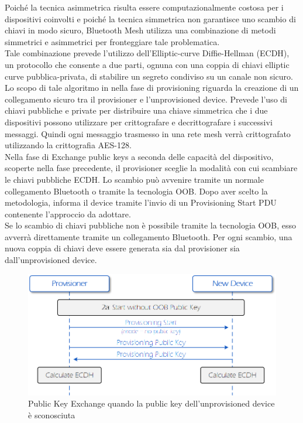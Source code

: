\noindent Poiché la tecnica asimmetrica risulta essere computazionalmente costosa per i dispositivi coinvolti e poiché la tecnica simmetrica non garantisce uno scambio di chiavi in modo sicuro, Bluetooth Mesh utilizza una combinazione di metodi simmetrici e asimmetrici per fronteggiare tale problematica.\\
Tale combinazione prevede l'utilizzo dell'Elliptic-curve Diffie-Hellman (ECDH), un protocollo che consente a due parti, ognuna con una coppia di chiavi elliptic curve pubblica-privata, di stabilire un segreto condiviso su un canale non sicuro. Lo scopo di tale algoritmo in nella fase di provisioning riguarda la creazione di un collegamento sicuro tra il provisioner e l'unprovisioned device. Prevede l'uso di chiavi pubbliche e private per distribuire una chiave simmetrica che i due dispositivi possono utilizzare per crittografare e decrittografare i successivi messaggi. Quindi ogni messaggio trasmesso in una rete mesh verrà crittografato utilizzando la crittografia AES-128.\\

\noindent Nella fase di Exchange public keys a seconda delle capacità del dispositivo, scoperte nella fase precedente, il provisioner sceglie la modalità con cui scambiare le chiavi pubbliche ECDH. Lo scambio può avvenire tramite un normale collegamento Bluetooth o tramite la tecnologia OOB.
Dopo aver scelto la metodologia, informa il device tramite l'invio di un Provisioning Start PDU contenente l'approccio da adottare.\\

\noindent Se lo scambio di chiavi pubbliche non è possibile tramite la tecnologia OOB, esso avverrà direttamente tramite un collegamento Bluetooth. Per ogni scambio, una nuova coppia di chiavi deve essere generata sia dal provisioner sia dall'unprovisioned device.

\begin{figure}[!ht]
    \centering
    \includegraphics[width = \textwidth]{images/Provisioning_public_key_exchange_a.png}
    \caption{Public Key Exchange quando la public key dell'unprovisioned device è sconosciuta}
    \label{fig:provisioning_public_key_a}
\end{figure}

